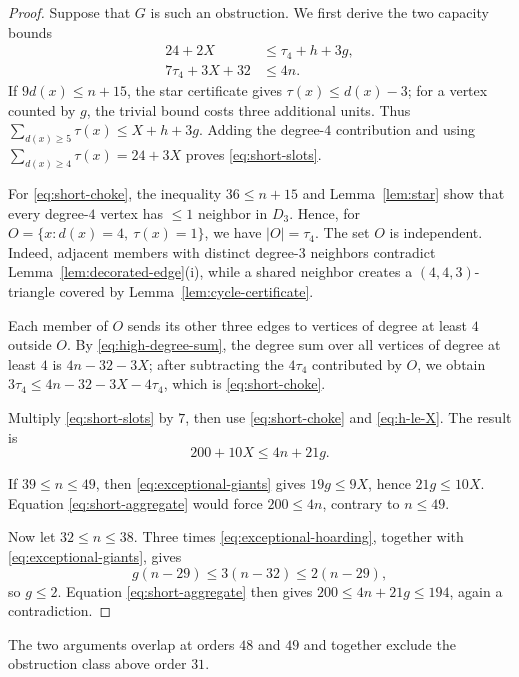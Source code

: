 \begin{proof}
Suppose that \(G\) is such an obstruction.  We first derive the two capacity
bounds
\begin{align}
  24+2X&\le\tau_4+h+3g,              \label{eq:short-slots}\\
  7\tau_4+3X+32&\le4n.               \label{eq:short-choke}
\end{align}
If \(9d(x)\le n+15\), the star certificate gives
\(\tau(x)\le d(x)-3\); for a vertex counted by \(g\), the trivial bound
costs three additional units.  Thus
\(\sum_{d(x)\ge5}\tau(x)\le X+h+3g\).  Adding the degree-\(4\) contribution
and using \(\sum_{d(x)\ge4}\tau(x)=24+3X\) proves
\eqref{eq:short-slots}.

For \eqref{eq:short-choke}, the inequality \(36\le n+15\) and
Lemma~\ref{lem:star} show that every degree-\(4\) vertex has \(\le1\)
neighbor in \(D_3\).  Hence, for
\(O=\{x:d(x)=4,\ \tau(x)=1\}\), we have \(|O|=\tau_4\).
The set \(O\) is independent.  Indeed, adjacent members with distinct
degree-\(3\) neighbors contradict Lemma~\ref{lem:decorated-edge}(i), while
a shared neighbor creates a \((4,4,3)\)-triangle covered by
Lemma~\ref{lem:cycle-certificate}.

Each member of \(O\) sends its other three edges to vertices of degree
at least \(4\) outside \(O\).  By \eqref{eq:high-degree-sum}, the degree sum
over all vertices of degree at least \(4\) is \(4n-32-3X\); after subtracting
the \(4\tau_4\) contributed by \(O\), we obtain
\(3\tau_4\le4n-32-3X-4\tau_4\), which is \eqref{eq:short-choke}.

Multiply \eqref{eq:short-slots} by \(7\), then use
\eqref{eq:short-choke} and \eqref{eq:h-le-X}.  The result is
\begin{equation}\label{eq:short-aggregate}
  200+10X\le4n+21g.
\end{equation}

If \(39\le n\le49\), then \eqref{eq:exceptional-giants} gives
\(19g\le9X\), hence \(21g\le10X\).  Equation
\eqref{eq:short-aggregate} would force \(200\le4n\), contrary to
\(n\le49\).

Now let \(32\le n\le38\).  Three times
\eqref{eq:exceptional-hoarding}, together with
\eqref{eq:exceptional-giants}, gives
\[
 g(n-29)\le3(n-32)\le2(n-29),
\]
so \(g\le2\).  Equation \eqref{eq:short-aggregate} then gives
\(200\le4n+21g\le194\), again a contradiction.
\end{proof}

The two arguments overlap at orders \(48\) and \(49\) and together exclude
the obstruction class above order \(31\).

